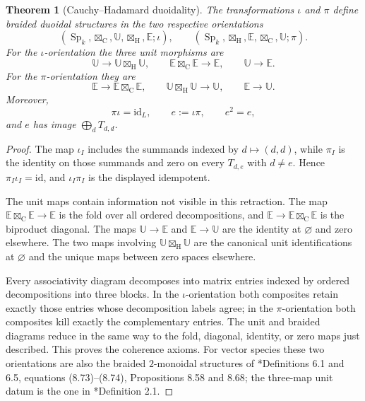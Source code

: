 \documentclass[11pt,reqno]{amsart}
\newtheorem{theorem}{Theorem}[section]
\theoremstyle{definition}
\theoremstyle{remark}
\providecommand{\id}{\mathrm{id}}
\providecommand{\Hd}{\boxtimes_{\mathrm{H}}}
\providecommand{\Cy}{\boxtimes_{\mathrm{C}}}
\begin{document}
\begin{theorem}[Cauchy--Hadamard duoidality]
\label{thm:species-duoidal}
The transformations \(\iota\) and \(\pi\) define braided duoidal
structures in the two respective orientations
\[
 (\operatorname{Sp}_k,\Cy,\mathbb U,\Hd,\mathbb E;\iota),
 \qquad
 (\operatorname{Sp}_k,\Hd,\mathbb E,\Cy,\mathbb U;\pi).
\]
For the \(\iota\)-orientation the three unit morphisms are
\[
 \mathbb U\longrightarrow\mathbb U\Hd\mathbb U,\qquad
 \mathbb E\Cy\mathbb E\longrightarrow\mathbb E,\qquad
 \mathbb U\longrightarrow\mathbb E.
\]
For the \(\pi\)-orientation they are
\[
 \mathbb E\longrightarrow\mathbb E\Cy\mathbb E,\qquad
 \mathbb U\Hd\mathbb U\longrightarrow\mathbb U,\qquad
 \mathbb E\longrightarrow\mathbb U.
\]
Moreover,
\[
 \pi\iota=\id_L,\qquad e:=\iota\pi,\qquad e^2=e,
\]
and \(e\) has image \(\bigoplus_dT_{d,d}\).
\end{theorem}

\begin{proof}
The map \(\iota_I\) includes the summands indexed by
\(d\mapsto(d,d)\), while \(\pi_I\) is the identity on those summands
and zero on every \(T_{d,e}\) with \(d\ne e\).  Hence
\(\pi_I\iota_I=\id\), and \(\iota_I\pi_I\) is the displayed
idempotent.

The unit maps contain information not visible in this retraction.  The
map \(\mathbb E\Cy\mathbb E\to\mathbb E\) is the fold over all ordered
decompositions, and
\(\mathbb E\to\mathbb E\Cy\mathbb E\) is the biproduct diagonal.
The maps \(\mathbb U\to\mathbb E\) and
\(\mathbb E\to\mathbb U\) are the identity at \(\varnothing\) and zero
elsewhere.  The two maps involving
\(\mathbb U\Hd\mathbb U\) are the canonical unit identifications at
\(\varnothing\) and the unique maps between zero spaces elsewhere.

Every associativity diagram decomposes into matrix entries indexed by
ordered decompositions into three blocks.  In the \(\iota\)-orientation
both composites retain exactly those entries whose decomposition labels
agree; in the \(\pi\)-orientation both composites kill exactly the
complementary entries.  The unit and braided diagrams reduce in the
same way to the fold, diagonal, identity, or zero maps just described.
This proves the coherence axioms.  For vector species these two
orientations are also the braided \(2\)-monoidal structures of
\cite{AM10}*{Definitions 6.1 and 6.5, equations (8.73)--(8.74),
Propositions 8.58 and 8.68};
the three-map unit datum is the one in
\cite{Tor25}*{Definition 2.1}.
\end{proof}
\end{document}
